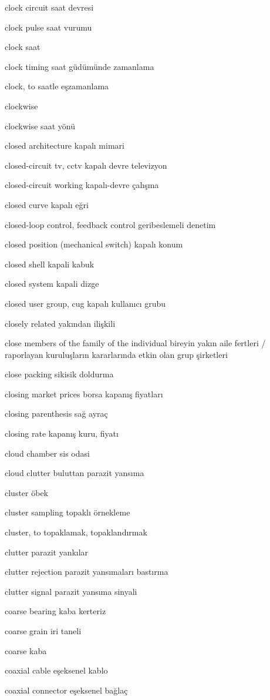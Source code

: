 \documentclass[12pt,fleqn]{article}\usepackage{../../common}
\begin{document}
clock circuit saat devresi

clock pulse saat vurumu

clock saat

clock timing saat güdümünde zamanlama

clock, to saatle eşzamanlama

clockwise

clockwise saat yönü

closed architecture kapalı mimari

closed-circuit tv, cctv kapalı devre televizyon

closed-circuit working kapalı-devre çalışma

closed curve kapalı eğri

closed-loop control, feedback control geribeslemeli denetim

closed position (mechanical switch) kapalı konum

closed shell kapali kabuk

closed system kapali dizge

closed user group, cug kapalı kullanıcı grubu

closely related yakından ilişkili

close members of the family of the individual bireyin yakın aile fertleri / raporlayan kuruluşların kararlarında etkin olan grup şirketleri

close packing sikisik doldurma

closing market prices borsa kapanış fiyatları

closing parenthesis sağ ayraç

closing rate kapanış kuru, fiyatı

cloud chamber sis odasi

cloud clutter buluttan parazit yansıma

cluster öbek

cluster sampling topaklı örnekleme

cluster, to topaklamak, topaklandırmak

clutter parazit yankılar

clutter rejection parazit yansımaları bastırma

clutter signal parazit yansıma sinyali

coarse bearing kaba kerteriz

coarse grain iri taneli

coarse kaba

coaxial cable eşeksenel kablo

coaxial connector eşeksenel bağlaç
\end{document}
